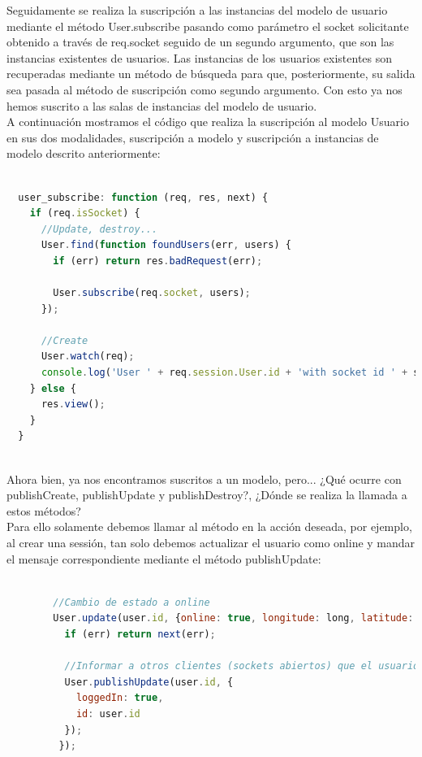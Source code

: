 Seguidamente se realiza la suscripción a las instancias del modelo de usuario mediante el método User.subscribe pasando como parámetro el socket solicitante obtenido a través de req.socket seguido
de un segundo argumento, que son las instancias existentes de usuarios. Las instancias de los usuarios existentes son recuperadas mediante un método de búsqueda para que, posteriormente, su salida 
sea pasada al método de suscripción como segundo argumento. Con esto ya nos hemos suscrito a las salas de instancias del modelo de usuario.\\

A continuación mostramos el código que realiza la suscripción al modelo Usuario en sus dos modalidades, suscripción a modelo y suscripción a instancias de modelo descrito anteriormente:

\begin{lstlisting}[language=JavaScript]

  user_subscribe: function (req, res, next) {
    if (req.isSocket) {
      //Update, destroy...
      User.find(function foundUsers(err, users) {
        if (err) return res.badRequest(err);

        User.subscribe(req.socket, users);
      });

      //Create
      User.watch(req);
      console.log('User ' + req.session.User.id + 'with socket id ' + sails.sockets.id(req) + ' is now subscribed to the model class \'User\'.');
    } else {
      res.view();
    }
  }
  
\end{lstlisting}

Ahora bien, ya nos encontramos suscritos a un modelo, pero... ¿Qué ocurre con publishCreate, publishUpdate y publishDestroy?, ¿Dónde se realiza la llamada a estos métodos?\\


Para ello solamente debemos llamar al método en la acción deseada, por ejemplo, al crear una sessión, tan solo debemos actualizar el usuario como online y mandar el mensaje correspondiente mediante
el método publishUpdate:\\

\begin{lstlisting}[language=JavaScript]

        //Cambio de estado a online
        User.update(user.id, {online: true, longitude: long, latitude: lat}, function (err){
          if (err) return next(err);

          //Informar a otros clientes (sockets abiertos) que el usuario esta logueado
          User.publishUpdate(user.id, {
            loggedIn: true,
            id: user.id
          });
         });

\end{lstlisting}


